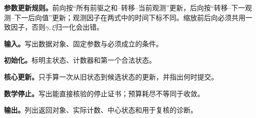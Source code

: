 \label{struct:V3-C05-CH23}
\textbf{参数更新规则。}前向按“所有前驱之和--转移--当前观测”更新，后向按“转移--下一观测--下一后向值”更新；观测因子在两式中的时间下标不同。缩放前后向必须共用一致因子，否则$\gamma,\xi$归一化会出错。



\begin{keypointbox}[title={缩放前向算法：五步阅读}]
\textbf{输入。}写出数据对象、固定参数与必须成立的条件。\par
\textbf{初始化。}标明主状态、计数器和第一个合法状态。\par
\textbf{核心更新。}只手算一次从旧状态到候选状态的更新，并指出何时提交。\par
\textbf{数学停止。}写出能直接核验的停止证书；预算耗尽不等同于收敛。\par
\textbf{输出。}列出返回对象、实际计数、中心状态和用于复核的诊断。
\end{keypointbox}

